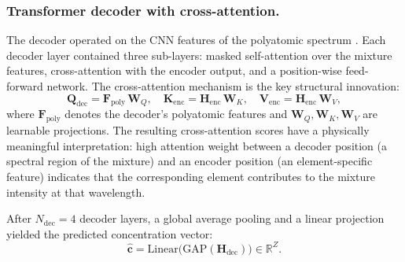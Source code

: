 \documentclass{iopjournal}
\begin{document}
\subsubsection{Transformer decoder with cross-attention.}

The decoder operated on the CNN features of the polyatomic spectrum \cite{vaswani_attention_2017}.
Each decoder layer contained three sub-layers: masked self-attention over the mixture features, cross-attention with the encoder output, and a position-wise feed-forward network.
The cross-attention mechanism is the key structural innovation:
\begin{equation}
\mathbf{Q}_{\mathrm{dec}} = \mathbf{F}_{\mathrm{poly}}\,\mathbf{W}_Q, \quad
\mathbf{K}_{\mathrm{enc}} = \mathbf{H}_{\mathrm{enc}}\,\mathbf{W}_K, \quad
\mathbf{V}_{\mathrm{enc}} = \mathbf{H}_{\mathrm{enc}}\,\mathbf{W}_V,
\end{equation}
where $\mathbf{F}_{\mathrm{poly}}$ denotes the decoder's polyatomic features and $\mathbf{W}_Q, \mathbf{W}_K, \mathbf{W}_V$ are learnable projections.
The resulting cross-attention scores have a physically meaningful interpretation: high attention weight between a decoder position (a spectral region of the mixture) and an encoder position (an element-specific feature) indicates that the corresponding element contributes to the mixture intensity at that wavelength.

After $N_{\mathrm{dec}} = 4$ decoder layers, a global average pooling and a linear projection yielded the predicted concentration vector:
\begin{equation}
\hat{\mathbf{c}} = \mathrm{Linear}\!\bigl(\mathrm{GAP}(\mathbf{H}_{\mathrm{dec}})\bigr) \in \mathbb{R}^{Z}.
\end{equation}
\end{document}
